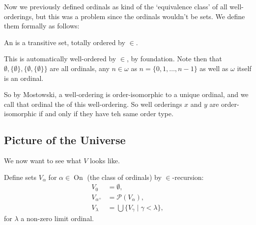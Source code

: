 \documentclass[a4paper, 10pt, twocolumn]{amsart}
\newcommand{\on}{\operatorname{On}}
\begin{document}
Now we previously defined ordinals as kind of the `equivalence class' of all well-orderings, but this was a problem since the ordinals wouldn't be sets. We define them formally as follows:

\begin{definition}[Ordinal]
  An  is a transitive set, totally ordered by $\in$.
\end{definition}

This is automatically well-ordered by $\in$, by foundation. Note then that $\emptyset, \{\emptyset\}, \{\emptyset,\{\emptyset\}\}$ are all ordinals, any $n \in \omega$ as $n = \{0, 1, \dots, n - 1\}$ as well as $\omega$ itself is an ordinal.
  
So by Mostowski, a well-ordering is order-isomorphic to a unique ordinal, and we call that ordinal the  of this well-ordering. So well orderings $x$ and $y$ are order-isomorphic if and only if they have teh same order type.

\subsection{Picture of the Universe}

We now want to see what $V$ looks like.

\begin{definition}
  Define sets $V_\alpha$ for $\alpha \in \on$ (the class of ordinals) by $\in$-recursion:
  \begin{align*}
    V_0 &= \emptyset, \\
    V_{\alpha^+} &= \mathcal{P}(V_\alpha), \\
    V_\lambda &= \bigcup \{V_\gamma \mid \gamma < \lambda\},
  \end{align*}
  for $\lambda$ a non-zero limit ordinal.
\end{definition}

\begin{center}
\end{center}
\end{document}
